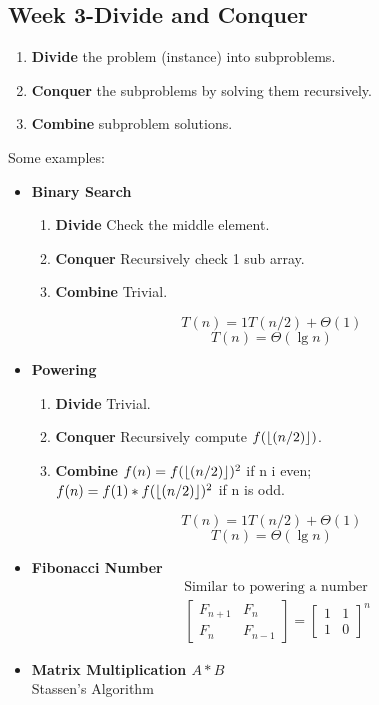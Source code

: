 \documentclass{article}
\DeclarePairedDelimiter\floor{\lfloor}{\rfloor}
\begin{document}
\begin{multicols*}{4}
\section{Week 3-Divide and Conquer}
\begin{enumerate}
\item \textbf{Divide} the problem (instance) into subproblems.
\item \textbf{Conquer} the subproblems by solving them recursively. 
\item \textbf{Combine} subproblem solutions.
\end{enumerate}
Some examples:
\begin{itemize}
\item \textbf{Binary Search}
	\begin{enumerate}
	\item \textbf{Divide} Check the middle element.
	\item \textbf{Conquer} Recursively check 1 sub array. 
	\item \textbf{Combine} Trivial.
	\end{enumerate}
	$$T(n)=1T(n/2) +\Theta(1)$$
	$$T(n)=\Theta(\lg n)$$
\item \textbf{Powering}
	\begin{enumerate}
	\item \textbf{Divide} Trivial.
	\item \textbf{Conquer} Recursively compute $f(\floor*{(n/2)})$. 
	\item \textbf{Combine} $f(n) = f(\floor*{(n/2)})^2$ if n i even;\\$f(n) = f(1)*f(\floor*{(n/2)})^2$ if n is odd.
	\end{enumerate}
	$$T(n)=1T(n/2) +\Theta(1)$$
	$$T(n)=\Theta(\lg n)$$
\item \textbf{Fibonacci Number}
\begin{align*}
	&\text{Similar to powering a number}\\
	&\begin{bmatrix}
		F_{n+1} & F_n\\
		F_n & F_{n-1}
	\end{bmatrix}
	=
	\begin{bmatrix}
		1 & 1\\
		1 & 0
	\end{bmatrix}^n
\end{align*}
\item \textbf{Matrix Multiplication $A*B$}
\\Stassen's Algorithm	
	\begin{enumerate}
	

\end{enumerate}
\end{itemize}
\end{multicols*}
\end{document}
